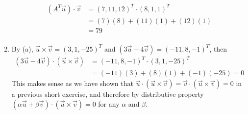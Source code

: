 \begin{Answer}
\begin{enumerate}[label=(\alph*)]
\begin{align*}
(A^T\vec{u}) \cdot \vec{v}
&= (7, 11, 12)^T \cdot (8, 1, 1)^T \\
&= (7)(8) + (11)(1) + (12)(1) \\
&= 79 \\
\end{align*}
\item By (a), $\vec{u} \times \vec{v} = (3, 1, -25)^T$ and $(3\vec{u} - 4\vec{v}) = (-11,8,-1)^T$, then
\begin{align*}
(3\vec{u} - 4\vec{v}) \cdot (\vec{u} \times \vec{v}) &= (-11,8,-1)^T \cdot (3, 1, -25)^T \\
&= (-11)(3) + (8)(1) + (-1)(-25) = 0
\end{align*}
This makes sense as we have shown that $\vec{u} \cdot (\vec{u} \times \vec{v}) = \vec{v} \cdot (\vec{u} \times \vec{v}) = 0$ in a previous short exercise, and therefore by distributive property $(\alpha\vec{u} + \beta\vec{v}) \cdot (\vec{u} \times \vec{v}) = 0$ for any $\alpha$ and $\beta$.
\end{enumerate}
\end{Answer}

